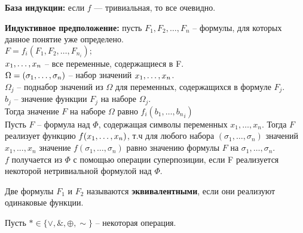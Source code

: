 \textbf{База индукции:} если $f$ --- тривиальная, то все очевидно.

\textbf{Индуктивное предположение:} пусть $F_1,F_2, \ldots, F_n$ -- формулы, для которых данное понятие уже определено. \\
$F=f_i(F_1,F_2, \ldots, {F_{n_i}});$ \\
$x_1, \ldots, x_n$ -- все переменные, содержащиеся в F. \\
$\Omega=(\sigma_1, \ldots, \sigma_n)$ -- набор значений $x_1, \ldots, x_n$. \\
$\Omega_j$ -- поднабор значений из $\Omega$ для переменных, содержащихся в формуле $F_j$. \\
$b_j$ -- значение функции $F_j$ на наборе $\Omega_j$. \\
Тогда значение $F$ на наборе $\Omega$ равно $f_i(b_1, \ldots, {b_n}_i)$ \\
Пусть $F$ -- формула над $\Phi$, содержащая символы переменных $x_1, \ldots, x_n$. Тогда $F$ реализует функцию $f(x_1, \ldots, x_n)$, т.ч для любого набора $(\sigma_1, \ldots, \sigma_n)$ значений $x_1,...,x_n$ значение $f(\sigma_1, \ldots, \sigma_n)$ равно значению формулы $F$ на $\sigma_1, \ldots, \sigma_n$. \\
$f$ получается из $\Phi$ с помощью операции суперпозиции, если F реализуется некоторой нетривиальной формулой над $\Phi$.

\begin{definition}
Две формулы $F_1$ и $F_2$ называются {\bf эквивалентными}, если они реализуют одинаковые функции.
\end{definition}

Пусть $\ast \in \{\vee, \&, \oplus, \sim \}$ -- некоторая операция.

